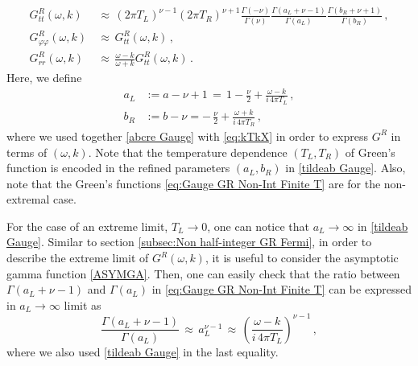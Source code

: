 \documentclass[11pt,a4paper]{article}
\newcommand{\ra}{\rightarrow}
\begin{document}
\begin{equation} \label{eq:Gauge GR Non-Int Finite T}
\begin{aligned}
    G^R_{tt}(\omega,k) \, & \approx\, (2\pi T_L)^{\nu-1} (2\pi T_R)^{\nu+1} \frac{\Gamma(-\nu)}{\Gamma(\nu)} \frac{\Gamma(a_L+\nu-1)}{\Gamma(a_L)} \frac{\Gamma(b_R+\nu+1)}{\Gamma(b_R)}\,,\\ G^R_{\varphi \varphi}(\omega,k) \, & \approx \, G^R_{tt}(\omega,k)\,,\\
    G^R_{rr}(\omega,k) \, & \approx\, \frac{\omega-k}{\omega+k} G^R_{tt}(\omega,k)\,.
\end{aligned}
\end{equation}
Here, we define
\begin{equation} \label{tildeab Gauge}
\begin{aligned}
    a_L & := a-\nu+1 \, = \, 1 -\frac{\nu}{2} + \frac{\omega - k}{i\,4\pi T_L}\,,\\
    b_R & := b-\nu = -\,\frac{\nu}{2} + \frac{\omega + k}{i\,4\pi T_R}\,,
\end{aligned}
\end{equation}
where we used together \eqref{abcre Gauge} with \eqref{eq:kTkX} in order to express $G^R$ in terms of $(\omega,k)$. Note that the temperature dependence $(T_L, T_R)$ of Green's function is encoded in the refined parameters $(a_L, b_R)$ in \eqref{tildeab Gauge}. Also, note that the Green's functions \eqref{eq:Gauge GR Non-Int Finite T} are for the non-extremal case.

For the case of an extreme limit, $T_{L} \ra 0$, one can notice that $a_L \ra \infty$ in \eqref{tildeab Gauge}. Similar to section \ref{subsec:Non half-integer GR Fermi}, in order to describe the extreme limit of $G^R(\omega,k)$, it is useful to consider the asymptotic gamma function \eqref{ASYMGA}. Then, one can easily check that the ratio between $\Gamma(a_L + \nu -1)$ and $\Gamma(a_L)$ in \eqref{eq:Gauge GR Non-Int Finite T} can be expressed in $a_L \ra \infty$ limit as
\begin{equation} \label{eq:Gamma function fraction expansion Gauge}
    \frac{\Gamma(a_L + \nu -1)}{\Gamma(a_L)} \, \approx \, a_L^{\nu-1} \, \approx \, \left( \frac{\omega - k}{i \, 4\pi T_L} \right)^{\nu-1}\,,
\end{equation}
where we also used \eqref{tildeab Gauge} in the last equality.
\end{document}
